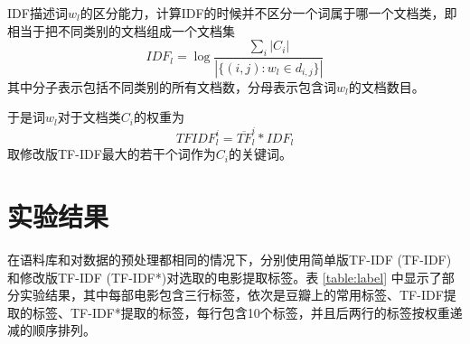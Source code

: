 \documentclass[a4paper, nofonts, nocap]{ctexart}
\begin{document}
IDF描述词$w_l$的区分能力，计算IDF的时候并不区分一个词属于哪一个文档类，即相当于把不同类别的文档组成一个文档集
\[ IDF_l = \log \frac{\sum_i |C_i|}{|\{(i, j):w_l \in d_{i, j}\}|} \]
其中分子表示包括不同类别的所有文档数，分母表示包含词$w_l$的文档数目。

于是词$w_l$对于文档类$C_i$的权重为
\[ TFIDF_l^i = \overline{TF}_l^i * IDF_l \]
取修改版TF-IDF最大的若干个词作为$C_i$的关键词。

\section{实验结果}
在语料库和对数据的预处理都相同的情况下，分别使用简单版TF-IDF (TF-IDF)和修改版TF-IDF (TF-IDF*)对选取的电影提取标签。表 \ref{table:label} 中显示了部分实验结果，其中每部电影包含三行标签，依次是豆瓣上的常用标签、TF-IDF提取的标签、TF-IDF*提取的标签，每行包含10个标签，并且后两行的标签按权重递减的顺序排列。
\end{document}
